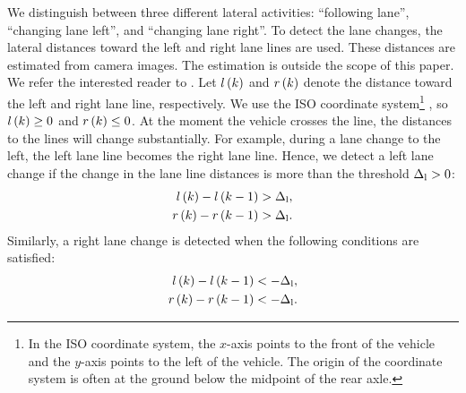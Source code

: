 We distinguish between three different lateral activities: ``following lane'', ``changing lane left'', and ``changing lane right''. 
To detect the lane changes, the lateral distances toward the left and right lane lines are used. 
These distances are estimated from camera images. 
The estimation is outside the scope of this paper. 
\cstartf We refer the interested reader to \cite{elfring2016effective}. \cendf
Let $l\left(k\right)$ and $r\left(k\right)$ denote the distance toward the left and right lane line, respectively. 
\cstarta We use the ISO coordinate system\cenda\cstartc\footnote{\cstartc In the ISO coordinate system, the $x$-axis points to the front of the vehicle and the $y$-axis points to the left of the vehicle. \cendc\cstartd The origin of the coordinate system is often at the ground below the midpoint of the rear axle.\cendd} \autocite{iso8855}\cendc\cstarta, so $l\left(k\right) \geq 0$ and $r\left(k\right) \leq 0$. 
At the moment the vehicle crosses the line, the distances to the lines will change substantially. 
For example, during a lane change to the left, the left lane line becomes the right lane line. 
Hence, we detect a left lane change \cstartd if the change in the lane line distances is more than the threshold $\Delta_{\mathrm{l}}>0$\cendd:
\begin{align}
	l\left(k\right) - l\left(k-1\right) &> \Delta_{\mathrm{l}}, \label{eq:potential left a} \\
	r\left(k\right) - r\left(k-1\right) &> \Delta_{\mathrm{l}}. \label{eq:potential left b}
\end{align}
Similarly, a right lane change is detected when the following conditions are satisfied:
\begin{align}
	l\left(k\right) - l\left(k-1\right) &< -\Delta_{\mathrm{l}}, \label{eq:potential right a}\\
	r\left(k\right) - r\left(k-1\right) &< -\Delta_{\mathrm{l}}. \label{eq:potential right b}
\end{align}

